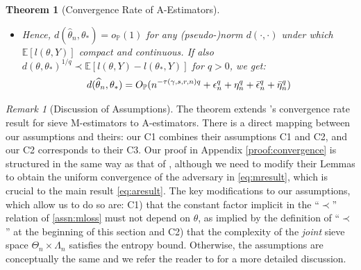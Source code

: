 \documentclass[12pt]{article}
\theoremstyle{myplain}
\newtheorem{theorem}{Theorem}[section]
\theoremstyle{definition}
\theoremstyle{definition}
\theoremstyle{remark}
\newtheorem{remark}{Remark}[section]
\numberwithin{equation}{section}
\begin{document}
\begin{theorem}[Convergence Rate of A-Estimators]
\begin{itemize}[leftmargin=*]
$$\begin{array}{ll}
{1-s}-\frac{\log \log n}{\log n}, & \text { if } r=0, \gamma \geq 1 \\
\frac{1-s}{2-\gamma}, & \text { if } r=0, \gamma<1 \\
\frac{1-s}{2-\min (1, \gamma)(2-r)/2}, & \text { if } 0<r<2 \\
\frac{1-s}{2}-\frac{\log \log n}{\log n}, & \text { if } r=2 \\
\frac{1-s}{r}, & \text { if } r>2
\end{array}\right.
$$
\item[ii)] Hence, $d(\widehat\theta_n, \theta_*)=o_\mathbb{P}(1)$ for any (pseudo-)norm $d(\cdot,\cdot)$ under which $\mathbb{E}[l(\theta, Y)]$ compact and continuous. If also $d(\theta, \theta_*)^{1/q}\prec \mathbb{E}[l(\theta, Y)-l(\theta_*,Y)]$ for $q>0$, we get:
$$d(\widehat\theta_n, \theta_*)=O_\mathbb{P}(n^{-\tau(\gamma, s, r, n)q}  + \epsilon_n^{q}+\eta_n^{q}+ \Bar \epsilon_n^{q}+\Bar \eta_n^{q})$$
\end{itemize}
\end{theorem}
\begin{remark}[Discussion of Assumptions] 
The theorem extends \cite{shen1994}'s convergence rate result for sieve M-estimators to A-estimators. There is a direct mapping between our assumptions and theirs: our C1 combines their assumptions C1 and C2, and our C2 corresponds to their C3. Our proof in Appendix \ref{proof:convergence} is structured in the same way as that of \cite{shen1994}, although we need to modify their Lemmas to obtain the uniform convergence of the adversary in \ref{eq:mresult}, which is crucial to the main result \ref{eq:aresult}. The key modifications to our assumptions, which allow us to do so are: C1) that the constant factor implicit in the ``$\prec$'' relation of \ref{assn:mloss} must not depend on $\theta$, as implied by the definition of ``$\prec$'' at the beginning of this section and C2) that the complexity of the {\it joint} sieve space $\Theta_n\times\Lambda_n$ satisfies the entropy bound. Otherwise, the assumptions are conceptually the same and we refer the reader to \cite{shen1994} for a more detailed discussion.
\end{remark}
\end{document}
